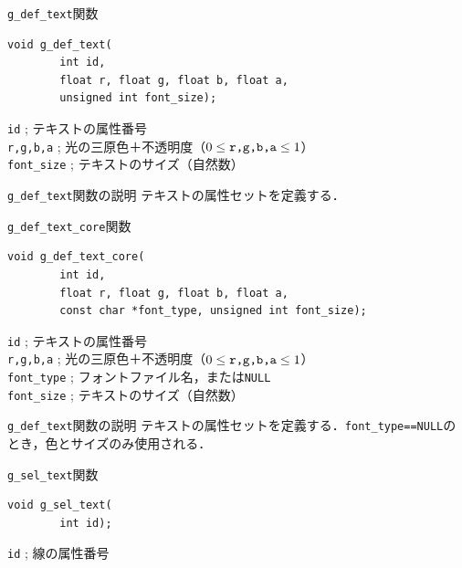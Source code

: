\documentclass[platex,a4paper,12pt]{jsarticle}%
\begin{document}
\begin{itembox}[l]{\texttt{g\_def\_text}関数}
\begin{verbatim}
void g_def_text(
        int id,
        float r, float g, float b, float a,
        unsigned int font_size);
\end{verbatim}
\verb|id| ; テキストの属性番号\\
\verb|r,g,b,a| ; 光の三原色＋不透明度（$0\leq \verb|r,g,b,a| \leq 1$）\\
\verb|font_size| ; テキストのサイズ（自然数）
\end{itembox}

\begin{itembox}[l]{\texttt{g\_def\_text}関数の説明}
テキストの属性セットを定義する．
\end{itembox}



\begin{itembox}[l]{\texttt{g\_def\_text\_core}関数}
\begin{verbatim}
void g_def_text_core(
        int id,
        float r, float g, float b, float a,
        const char *font_type, unsigned int font_size);
\end{verbatim}
\verb|id| ; テキストの属性番号\\
\verb|r,g,b,a| ; 光の三原色＋不透明度（$0\leq \verb|r,g,b,a| \leq 1$）\\
\verb|font_type| ; フォントファイル名，または\verb|NULL|\\
\verb|font_size| ; テキストのサイズ（自然数）
\end{itembox}

\begin{itembox}[l]{\texttt{g\_def\_text}関数の説明}
	テキストの属性セットを定義する．\verb|font_type==NULL|のとき，色とサイズのみ使用される．
\end{itembox}

\begin{itembox}[l]{\texttt{g\_sel\_text}関数}
\begin{verbatim}
void g_sel_text(
        int id);
\end{verbatim}
\verb|id| ; 線の属性番号
\end{itembox}
\end{document}
